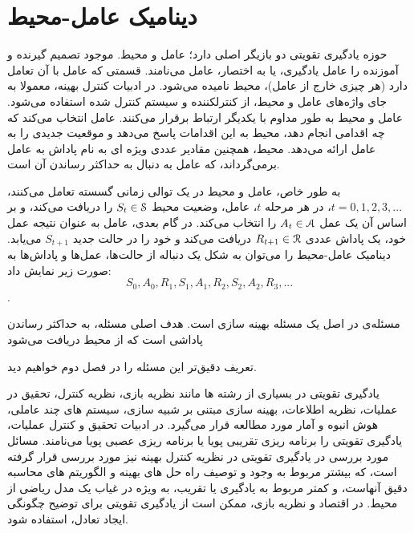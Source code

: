 \section{دینامیک عامل-محیط}
حوزه یادگیری تقویتی  دو بازیگر اصلی دارد؛ عامل و محیط. موجود تصمیم گیرنده و آموزنده را عامل یادگیری، یا به اختصار، عامل می‌نامند. قسمتی که عامل با آن تعامل دارد (هر چیزی خارج از عامل)، محیط نامیده می‌شود. در ادبیات کنترل بهینه، معمولا به جای واژه‌های عامل و محیط، از  کنترل\nf کننده 
و سیستم کنترل شده  استفاده می‌شود.
عامل و محیط به طور مداوم با یکدیگر ارتباط برقرار می‌کنند. عامل انتخاب می‌کند که چه اقدامی‌ انجام دهد، محیط به این اقدامات پاسخ می‌دهد و موقعیت جدیدی را به عامل ارائه می‌دهد.
محیط، همچنین مقادیر عددی ویژه ای به نام پاداش  به عامل برمی‌گرداند، که عامل به دنبال به حداکثر رساندن آن است. 

به طور خاص، عامل و محیط در یک توالی زمانی گسسته تعامل می‌کنند، 
$t = 0,1,2,3,...$،
در هر مرحله $t$، عامل، وضعیت محیط  
$S_t \in \EuScript{S}$
را دریافت می‌کند، و بر اساس آن یک عمل 
$A_t \in \EuScript{A}$
را انتخاب می‌کند. در گام بعدی، عامل به عنوان نتیجه عمل خود، یک پاداش عددی $R_{t+1} \in \EuScript{R}$ دریافت می‌کند و خود را در حالت جدید $S_{t+1}$ می‌یابد.
دینامیک عامل-محیط را می‌توان به شکل یک دنباله از حالت‌ها، عمل‌ها و پاداش‌ها به صورت زیر نمایش داد:
$$S_0, A_0, R_1, S_1, A_1, R_2, S_2, A_2, R_3, ...$$.



مسئله‌ی  در اصل یک مسئله بهینه سازی است. هدف اصلی مسئله، به حداکثر رساندن پاداشی است که از محیط دریافت می‌شود

تعریف دقیق‌تر این مسئله را در فصل دوم خواهیم دید.

یادگیری تقویتی
در بسیاری از رشته ها مانند نظریه بازی، نظریه کنترل، تحقیق در عملیات، نظریه اطلاعات، بهینه سازی مبتنی بر شبیه سازی، سیستم های چند عاملی، هوش انبوه و آمار مورد مطالعه قرار می‌گیرد. در ادبیات تحقیق و کنترل عملیات، یادگیری تقویتی را برنامه ریزی تقریبی پویا   یا برنامه ریزی عصبی پویا   می‌نامند. مسائل مورد بررسی در یادگیری تقویتی در نظریه کنترل بهینه  نیز مورد بررسی قرار گرفته است، که بیشتر مربوط به وجود و توصیف راه حل های بهینه و الگوریتم های محاسبه دقیق آنهاست، و کمتر مربوط به یادگیری یا تقریب، به ویژه در غیاب یک مدل ریاضی از محیط. در اقتصاد و نظریه بازی، ممکن است از یادگیری تقویتی برای توضیح چگونگی ایجاد تعادل، استفاده شود.


